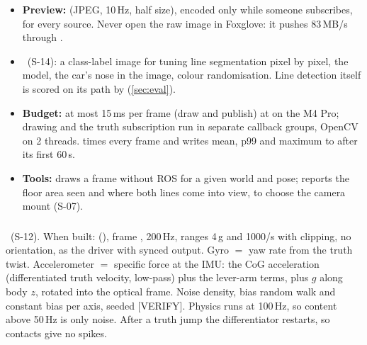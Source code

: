 \documentclass[11pt,a4paper]{article}
\newcommand{\deferred}{\target{Deferred}}
\begin{document}
\begin{itemize}
  \item \textbf{Preview:}  (JPEG, 10\,Hz, half size), encoded only while someone subscribes, for every source. Never open the raw image in Foxglove: it pushes 83\,MB/s through .
  \item \deferred\ (S-14): a class-label image for tuning line segmentation pixel by pixel, the  model, the car's nose in the image, colour randomisation. Line detection itself is scored on its path by  (\cref{sec:eval}).
  \item \textbf{Budget:} at most 15\,ms per frame (draw and publish) at  on the M4 Pro; drawing and the truth subscription run in separate callback groups, OpenCV on 2 threads.  times every frame and writes mean, p99 and maximum to  after its first 60\,s.
  \item \textbf{Tools:}  draws a frame without ROS for a given world and pose;  reports the floor area seen and where both lines come into view, to choose the camera mount (S-07).
\end{itemize}

\subsubsection{}\label{sec:imu}
\deferred\ (S-12). When built:  (), frame , 200\,Hz, ranges 4\,g and 1000\textdegree/s with clipping, no orientation, as the driver with synced output. Gyro $=$ yaw rate from the truth twist. Accelerometer $=$ specific force at the IMU: the CoG acceleration (differentiated truth velocity, low-pass) plus the lever-arm terms, plus $g$ along body $z$, rotated into the optical frame. Noise density, bias random walk and constant bias per axis, seeded [VERIFY]. Physics runs at 100\,Hz, so content above 50\,Hz is only noise. After a truth jump the differentiator restarts, so contacts give no spikes.
\end{document}
